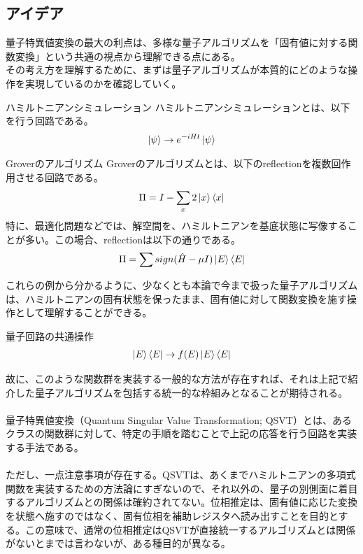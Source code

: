\documentclass[a4paper,10.5pt]{article}
\numberwithin{equation}{section}
\begin{document}
\subsection{アイデア}
量子特異値変換の最大の利点は、多様な量子アルゴリズムを「固有値に対する関数変換」という共通の視点から理解できる点にある。\\

その考え方を理解するために、まずは量子アルゴリズムが本質的にどのような操作を実現しているのかを確認していく。
\begin{setupbox}{ハミルトニアンシミュレーション}
ハミルトニアンシミュレーションとは、以下を行う回路である。
\begin{align*}
    \ket{\psi}\to e^{-iHt}\ket{\psi}
\end{align*}
\end{setupbox}
\begin{setupbox}{Groverのアルゴリズム}
Groverのアルゴリズムとは、以下のreflectionを複数回作用させる回路である。
\begin{align*}
    \Pi=I-\sum_{x}2\ket{x}\bra{x}
\end{align*}
特に、最適化問題などでは、解空間を、ハミルトニアンを基底状態に写像することが多い。この場合、reflectionは以下の通りである。
\begin{align*}
    \Pi= \sum sign(\hat{H}-\mu I)\ket{E}\bra{E}
\end{align*}
\end{setupbox}
これらの例から分かるように、少なくとも本論で今まで扱った量子アルゴリズムは、ハミルトニアンの固有状態を保ったまま、固有値に対して関数変換を施す操作として理解することができる。
\begin{resultbox}{量子回路の共通操作}
\begin{align*}
    \ket{E}\bra{E}\to f(E)\ket{E}\bra{E}
\end{align*}
\end{resultbox}
故に、このような関数群を実装する一般的な方法が存在すれば、それは上記で紹介した量子アルゴリズムを包括する統一的な枠組みとなることが期待される。\\
\\
量子特異値変換（Quantum Singular Value Transformation; QSVT）とは、あるクラスの関数群に対して、特定の手順を踏むことで上記の応答を行う回路を実装する手法である。\\
\\
ただし、一点注意事項が存在する。QSVTは、あくまでハミルトニアンの多項式関数を実装するための方法論にすぎないので、それ以外の、量子の別側面に着目するアルゴリズムとの関係は確約されてない。位相推定は、固有値に応じた変換を状態へ施すのではなく、固有位相を補助レジスタへ読み出すことを目的とする。この意味で、通常の位相推定はQSVTが直接統一するアルゴリズムとは関係がないとまでは言わないが、ある種目的が異なる。
\end{document}
